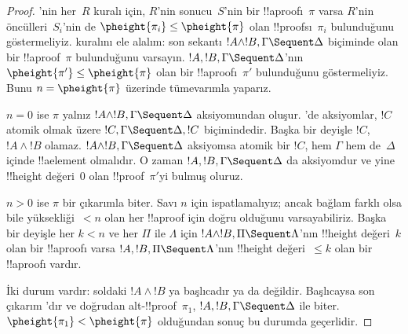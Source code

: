 \begin{proof}
'nin her~$R$ kuralı için, $R$'nin sonucu~$S$'nin bir
!!a{proof}{}ı~$\pi$ varsa $R$'nin öncülleri~$S_i$'nin de
$\pheight{\pi_i} \le \pheight{\pi}$ olan !!{proof}s{}ı~$\pi_i$ bulunduğunu
göstermeliyiz. \LeftR{\land} kuralını ele alalım: son sekantı $!A \land
!B, \Gamma \Sequent \Delta$ biçiminde olan bir !!a{proof}~$\pi$
bulunduğunu varsayın. $!A, !B, \Gamma \Sequent \Delta$'nın
$\pheight{\pi'} \le \pheight{\pi}$ olan bir !!a{proof}{}ı~$\pi'$ bulunduğunu
göstermeliyiz. Bunu $n = \pheight{\pi}$ üzerinde tümevarımla yaparız.

$n = 0$ ise $\pi$ yalnız $!A \land !B, \Gamma \Sequent \Delta$
aksiyomundan oluşur. 'de aksiyomlar, $!C$ atomik olmak üzere
$!C, \Gamma \Sequent \Delta, !C$ biçimindedir. Başka bir deyişle $!C$,
$!A \land !B$ olamaz. $!A \land !B, \Gamma \Sequent \Delta$ aksiyomsa
atomik bir $!C$, hem $\Gamma$ hem de~$\Delta$ içinde !!a{element} olmalıdır.
O zaman $!A, !B, \Gamma \Sequent \Delta$ da aksiyomdur ve yine
!!{height} değeri~$0$ olan !!{proof}~$\pi'$yi bulmuş oluruz.

$n>0$ ise $\pi$ bir çıkarımla biter. Savı $n$ için ispatlamalıyız; ancak
bağlam farklı olsa bile yüksekliği~$<n$ olan her !!a{proof} için doğru
olduğunu varsayabiliriz. Başka bir deyişle her $k<n$ ve her $\Pi$ ile
$\Lambda$ için $!A \land !B, \Pi \Sequent \Lambda$'nın !!{height} değeri~$k$
olan bir !!a{proof}{}ı varsa $!A, !B, \Pi \Sequent \Lambda$'nın
!!{height} değeri~$\le k$ olan bir !!a{proof}{}ı vardır.

İki durum vardır: soldaki $!A \land !B$ ya başlıcadır ya da değildir.
Başlıcaysa son çıkarım \LeftR{\land}'dır ve doğrudan
alt-!!{proof}~$\pi_1$, $!A, !B, \Gamma \Sequent \Delta$ ile biter.
$\pheight{\pi_1} < \pheight{\pi}$ olduğundan sonuç bu durumda geçerlidir.


\end{proof}
